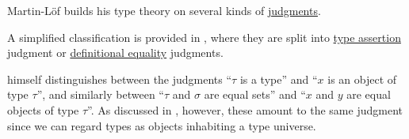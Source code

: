 \begin{remark}\label{rem:typing_judgments}
  Martin-L\"of builds his type theory on several kinds of \hyperref[con:judgment]{judgments}.

  A simplified classification is provided in \cite[19]{UnivalentFoundationsProgram2024OctoberHoTT}, where they are split into \hyperref[def:type_assertion]{type assertion} judgment or \hyperref[con:equality]{definitional equality} judgments.

   himself distinguishes between the judgments \enquote{\( \tau \) is a type} and \enquote{\( x \) is an object of type \( \tau \)}, and similarly between \enquote{\( \tau \) and \( \sigma \) are equal sets} and \enquote{\( x \) and \( y \) are equal objects of type \( \tau \)}. As discussed in , however, these amount to the same judgment since we can regard types as objects inhabiting a type universe.
\end{remark}

